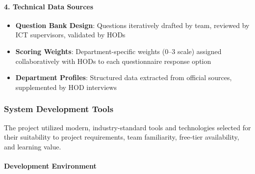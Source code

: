 \documentclass[12pt, a4paper]{article}
\begin{document}
\paragraph{4. Technical Data Sources}

\begin{itemize}[leftmargin=1.5em, itemsep=3pt]
    \item \textbf{Question Bank Design}: Questions iteratively drafted by team, reviewed by ICT supervisors, validated by HODs
    \item \textbf{Scoring Weights}: Department-specific weights (0--3 scale) assigned collaboratively with HODs to each questionnaire response option
    \item \textbf{Department Profiles}: Structured data extracted from official sources, supplemented by HOD interviews
\end{itemize}

\subsubsection{System Development Tools}

The project utilized modern, industry-standard tools and technologies selected for their suitability to project requirements, team familiarity, free-tier availability, and learning value.

\paragraph{Development Environment}
\end{document}
